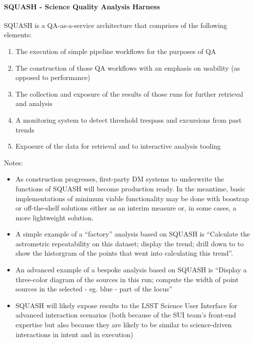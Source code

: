 \paragraph{SQUASH - Science Quality Analysis Harness}
\label{sec:qaSquash}

SQUASH is a QA-as-a-service architecture that comprises of the
following elements:

\begin{enumerate}
\item The execution of simple pipeline workflows for the purposes of QA

\item The construction of those QA workflows with an emphasis on usability (as opposed to performance)

\item The collection and exposure of the results of those runs for further retrieval and analysis

\item A monitoring system to detect threshold trespass and excursions from past trends

\item Exposure of the data for retrieval and to interactive analysis tooling

\end{enumerate}


Notes:

\begin{itemize}

\item As construction progresses, first-party DM systems to underwrite the functions of SQUASH will become production ready. In the meantime, basic implementations of minimum viable functionality may be done with boostrap or off-the-shelf solutions either as an interim measure or, in some cases, a more lightweight solution. 

\item A simple example of a ``factory'' analysis based on SQUASH is ``Calculate the astrometric repeatability on this dataset; display the trend; drill down to to show the historgram of the points that went into calculating this trend''. 

\item An advanced example of a bespoke analysis based on SQUASH is “Display a three-color diagram of the sources in this run; compute the width of point sources in the selected - eg. blue - part of the locus''

\item SQUASH will likely expose results to the LSST Science User Interface for advanced interaction scenarios (both because of the SUI team's front-end expertise but also because they are likely to be similar to science-driven interactions in intent and in execution)

\end{itemize}

